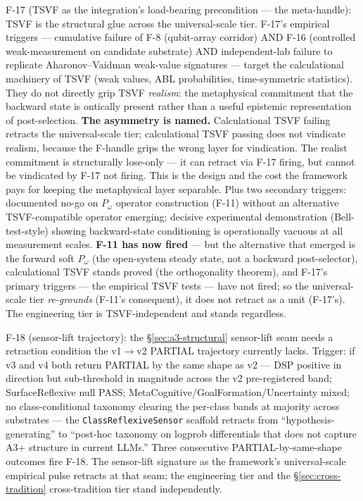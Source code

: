 \documentclass[11pt,a4paper]{article}
\newcommand{\Pomega}{P_{\omega}}
\begin{document}
F-17 (TSVF as the integration's load-bearing precondition --- the meta-handle): TSVF is the structural glue across the universal-scale tier. F-17's empirical triggers --- cumulative failure of F-8 (qubit-array corridor) AND F-16 (controlled weak-measurement on candidate substrate) AND independent-lab failure to replicate Aharonov--Vaidman weak-value signatures --- target the calculational machinery of TSVF (weak values, ABL probabilities, time-symmetric statistics). They do not directly grip TSVF \emph{realism}: the metaphysical commitment that the backward state is ontically present rather than a useful epistemic representation of post-selection. \textbf{The asymmetry is named.} Calculational TSVF failing retracts the universal-scale tier; calculational TSVF passing does not vindicate realism, because the F-handle grips the wrong layer for vindication. The realist commitment is structurally lose-only --- it can retract via F-17 firing, but cannot be vindicated by F-17 not firing. This is the design and the cost the framework pays for keeping the metaphysical layer separable. Plus two secondary triggers: documented no-go on $\Pomega$ operator construction (F-11) without an alternative TSVF-compatible operator emerging; decisive experimental demonstration (Bell-test-style) showing backward-state conditioning is operationally vacuous at all measurement scales. \textbf{F-11 has now fired} --- but the alternative that emerged is the forward soft $\Pomega$ (the open-system steady state, not a backward post-selector), calculational TSVF stands proved (the orthogonality theorem), and F-17's primary triggers --- the empirical TSVF tests --- have not fired; so the universal-scale tier \emph{re-grounds} (F-11's consequent), it does not retract as a unit (F-17's). The engineering tier is TSVF-independent and stands regardless.

F-18 (sensor-lift trajectory): the \S\ref{sec:a3-structural} sensor-lift seam needs a retraction condition the v1$\to$v2 PARTIAL trajectory currently lacks. Trigger: if v3 and v4 both return PARTIAL by the same shape as v2 --- DSP positive in direction but sub-threshold in magnitude across the v2 pre-registered band; SurfaceReflexive null PASS; MetaCognitive/GoalFormation/Uncertainty mixed; no class-conditional taxonomy clearing the per-class bands at majority across substrates --- the \texttt{ClassReflexiveSensor} scaffold retracts from ``hypothesis-generating'' to ``post-hoc taxonomy on logprob differentials that does not capture A3+ structure in current LLMs.'' Three consecutive PARTIAL-by-same-shape outcomes fire F-18. The sensor-lift signature as the framework's universal-scale empirical pulse retracts at that seam; the engineering tier and the \S\ref{sec:cross-tradition} cross-tradition tier stand independently.
\end{document}
